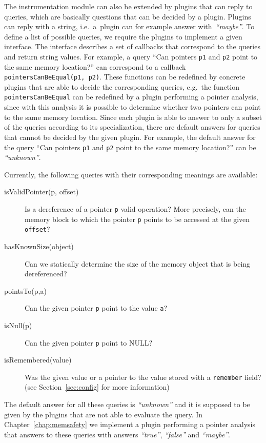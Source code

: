 The instrumentation module can also be extended by plugins that can reply to
queries, which are basically questions that can be decided by a plugin. Plugins
can reply with a string, i.e.~a~plugin can for example answer
with~\emph{``maybe''}.  To define a list of possible queries, we require the
plugins to implement a given interface. The interface describes a set of
callbacks that correspond to the queries and return string values. For example,
a query ``Can pointers \texttt{p1} and \texttt{p2} point to the same memory
location?'' can correspond to a callback \texttt{pointersCanBeEqual(p1, p2)}.
These functions can be redefined by concrete plugins that are able to decide
the corresponding queries, e.g.~the function \texttt{pointersCanBeEqual} can be
redefined by a plugin performing a pointer analysis, since with this analysis
it is possible to determine whether two pointers can point to the same memory
location. Since each plugin is able to answer to only a subset of the queries
according to its specialization, there are default answers for queries that
cannot be decided by the given plugin. For example, the default answer for the
query ``Can pointers \texttt{p1} and \texttt{p2} point to the same memory
location?'' can be \emph{``unknown''}.

Currently, the following queries with their corresponding meanings are available:
\begin{description}
  \item[isValidPointer(p, offset)] Is a dereference of a pointer \texttt{p}
  valid operation? More precisely, can the memory block to which the pointer
  \texttt{p} points to be accessed at the given \texttt{offset}?
  \item[hasKnownSize(object)] Can we statically determine the size of the memory
         object that is being dereferenced?
  \item[pointsTo(p,a)] Can the given pointer \texttt{p} point to the value \texttt{a}?
  \item[isNull(p)] Can the given pointer \texttt{p} point to NULL?
  \item[isRemembered(value)] Was the given value or a pointer to the value
  stored with a \texttt{remember} field? (see Section~\ref{sec:config} for more
  information)
\end{description}
The default answer for all these queries is \emph{``unknown''} and it is
supposed to be given by the plugins that are not able to evaluate the query. In
Chapter~\ref{chap:memsafety} we implement a plugin performing a pointer
analysis that answers to these queries with answers \emph{``true''},
\emph{``false''} and \emph{``maybe''}.

